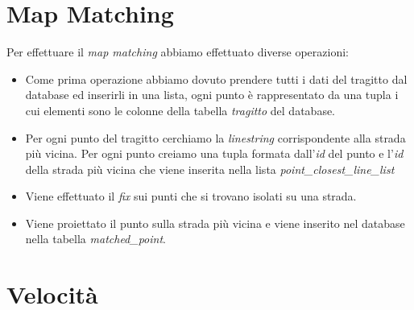 \documentclass[12pt]{report}
\begin{document}
\chapter*{Map Matching}
Per effettuare il \textit{map matching} abbiamo effettuato diverse operazioni:
\begin{itemize}
	\item Come prima operazione abbiamo dovuto prendere tutti i dati del tragitto dal database ed inserirli in una lista, ogni punto è rappresentato da una tupla i cui elementi sono le colonne della tabella \textit{tragitto} del database. 
	\item Per ogni punto del tragitto cerchiamo la \textit{linestring} corrispondente alla strada più vicina. Per ogni punto creiamo una tupla formata dall'\textit{id} del punto e l'\textit{id} della strada più vicina che viene inserita nella lista \textit{point\_closest\_line\_list} 
	\item Viene effettuato il \textit{fix} sui punti che si trovano isolati su una strada. 
	\item Viene proiettato il punto sulla strada più vicina e viene inserito nel database nella tabella \textit{matched\_point}.
	
\end{itemize}
	
\chapter*{Velocità}
	
	
	
	
	
	
	
	
\end{document}
